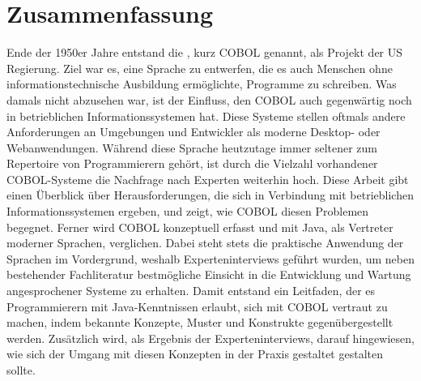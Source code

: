\chapter*{Zusammenfassung} 

Ende der 1950er Jahre entstand die , kurz \mbox{COBOL} genannt, als Projekt der US Regierung. Ziel war es, eine Sprache zu entwerfen, die es auch Menschen ohne informationstechnische Ausbildung ermöglichte, Programme zu schreiben. Was damals nicht abzusehen war, ist der Einfluss, den COBOL auch gegenwärtig noch in betrieblichen Informationssystemen hat. Diese Systeme stellen oftmals andere Anforderungen an Umgebungen und Entwickler als moderne Desktop- oder Webanwendungen. Während diese Sprache heutzutage immer seltener zum Repertoire von Programmierern gehört, ist durch die Vielzahl vorhandener COBOL-Systeme die Nachfrage nach Experten weiterhin hoch. Diese Arbeit gibt einen Überblick über Herausforderungen, die sich in Verbindung mit betrieblichen Informationssystemen ergeben, und zeigt, wie COBOL diesen Problemen begegnet. Ferner wird COBOL konzeptuell erfasst und mit Java, als Vertreter moderner Sprachen, verglichen. Dabei steht stets die praktische Anwendung der Sprachen im Vordergrund, weshalb Experteninterviews geführt wurden, um neben bestehender Fachliteratur bestmögliche Einsicht in die Entwicklung und Wartung angesprochener Systeme zu erhalten. Damit entstand ein Leitfaden, der es Programmierern mit Java-Kenntnissen erlaubt, sich mit COBOL vertraut zu machen, indem bekannte Konzepte, Muster und Konstrukte gegenübergestellt werden. Zusätzlich wird, als Ergebnis der Experteninterviews, darauf hingewiesen, wie sich der Umgang mit diesen Konzepten in der Praxis gestaltet \bzw gestalten sollte. 